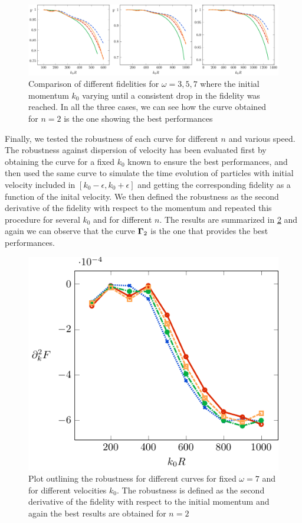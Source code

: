 \begin{figure}[t!]
		\includegraphics[width = \textwidth]{gfx/fidelities.pdf}
	\caption{Comparison of different fidelities for $ \omega = 3,5,7 $ where the initial momentum $ k_{0} $ varying until a consistent drop in the fidelity was reached. In all the three cases, we can see how the curve obtained for $ n = 2 $ is the one showing the best performances}
	\label{fig:fidelities}
\end{figure}
Finally, we tested the robustness of each curve for different $ n $ and various speed.
The robustness against dispersion of velocity has been evaluated first by obtaining the curve for a fixed $ k_{0} $ known to ensure the best performances, and then used the same curve to simulate the time evolution of particles with initial velocity included in  $[ k_{0}  -  \epsilon,k_{0}  +  \epsilon]  $ and getting the corresponding fidelity as a function of the inital velocity.
We then defined the robustness as the second derivative of the fidelity with respect to the momentum and repeated this procedure for several $ k_{0} $ and for different $ n $.
The results are summarized in \cref{fig:robustness} and again we can observe that the curve $ \mathbf{\Gamma}_{2} $ is the one that provides the best performances.
\begin{figure}
	\includegraphics{gfx/robustness.pdf}
	\caption{Plot outlining the robustness for different curves for fixed $ \omega = 7 $ and for different velocities $ k_{0} $. The robustness is defined as the second derivative of the fidelity with respect to the initial momentum and again the best results are obtained for $ n = 2 $ }
	\label{fig:robustness}
\end{figure}
